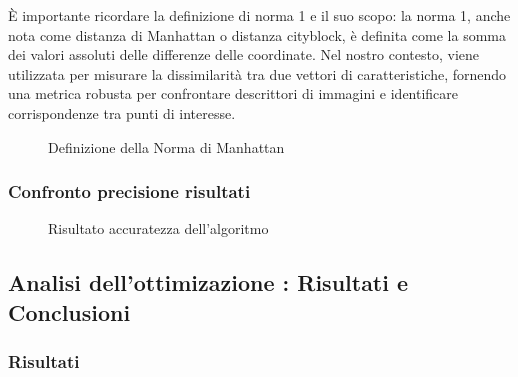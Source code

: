 \documentclass[12pt,a4paper]{report}
\begin{document}
\vspace{1cm}

È importante ricordare la definizione di norma 1 e il suo scopo: la norma 1, anche nota come distanza di Manhattan o distanza cityblock, è definita come la somma dei valori assoluti delle differenze delle coordinate. Nel nostro contesto, viene utilizzata per misurare la dissimilarità tra due vettori di caratteristiche, fornendo una metrica robusta per confrontare descrittori di immagini e identificare corrispondenze tra punti di interesse.

\begin{figure}[h]
    \centering
    \caption{Definizione della Norma di Manhattan}
\end{figure}

\subsubsection{Confronto precisione risultati}

\begin{figure}[h]
    \centering
    \caption{Risultato accuratezza dell'algoritmo}
\end{figure}

\newpage
\subsection{Analisi dell'ottimizazione : Risultati e Conclusioni}

\subsubsection{Risultati}
\end{document}
